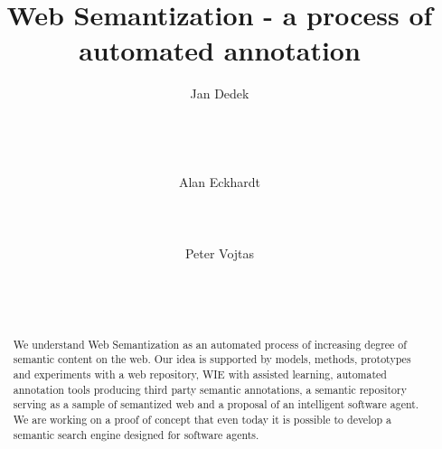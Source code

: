 \documentclass{www2009-submission}
\begin{document}
%
\title{Web Semantization - a process of automated annotation}


\author{
\alignauthor Jan Dedek\\
       \\
       \\
       \\
       \\
\alignauthor Alan Eckhardt\\
       \\
       \\
       \\
\alignauthor Peter Vojtas\\
       \\
       \\
       \\
}

\maketitle
\begin{abstract}
We understand Web Semantization as an automated process of increasing degree of semantic content on the web. %
Our idea is supported by models, methods, prototypes and experiments with a web repository, WIE with assisted learning, automated annotation tools producing third party semantic annotations, a semantic repository serving as a sample of semantized web and a proposal of an intelligent software agent. We are working on a proof of concept that even today it is possible to develop a semantic search engine designed for software agents.
\end{abstract}

\end{document}
